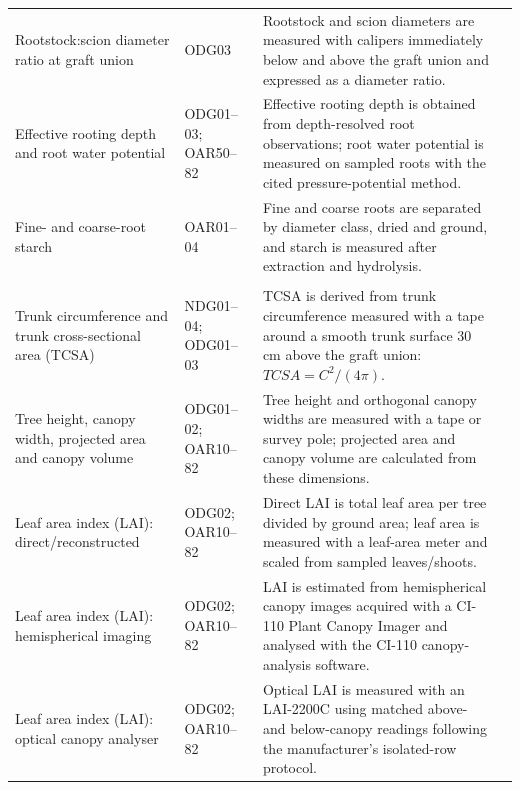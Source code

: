 \begin{landscape}
\begin{longtable}{>{\RaggedRight\arraybackslash}p{5.1cm} >{\RaggedRight\arraybackslash}p{2.3cm} >{\RaggedRight\arraybackslash}p{16.7cm} >{\RaggedRight\arraybackslash}p{2.4cm}}
Rootstock:scion diameter ratio at graft union &
ODG03 &
Rootstock and scion diameters are measured with calipers immediately below and above the graft union and expressed as a diameter ratio. &
\citep{serrano2023}\\

Effective rooting depth and root water potential &
ODG01--03; OAR50--82 &
Effective rooting depth is obtained from depth-resolved root observations; root water potential is measured on sampled roots with the cited pressure-potential method. &
\citep{tsoulias2020}\\

Fine- and coarse-root starch &
OAR01--04 &
Fine and coarse roots are separated by diameter class, dried and ground, and starch is measured after extraction and hydrolysis. &
\citep{mochizuki1956}\\

\multicolumn{4}{l}{\textbf{Tree size, canopy, crop load and productivity}}\\
Trunk circumference and trunk cross-sectional area (TCSA) &
NDG01--04; ODG01--03 &
TCSA is derived from trunk circumference measured with a tape around a smooth trunk surface 30 cm above the graft union: $TCSA=C^2/(4\pi)$. &
\citep{gonzalez2023}\\

Tree height, canopy width, projected area and canopy volume &
ODG01--02; OAR10--82 &
Tree height and orthogonal canopy widths are measured with a tape or survey pole; projected area and canopy volume are calculated from these dimensions. &
\citep{sun2020}\\

Leaf area index (LAI): direct/reconstructed &
ODG02; OAR10--82 &
Direct LAI is total leaf area per tree divided by ground area; leaf area is measured with a leaf-area meter and scaled from sampled leaves/shoots. &
\citep{wunsche1996,middleton2002}\\

Leaf area index (LAI): hemispherical imaging &
ODG02; OAR10--82 &
LAI is estimated from hemispherical canopy images acquired with a CI-110 Plant Canopy Imager and analysed with the CI-110 canopy-analysis software. &
\citep{knerl2018}\\

Leaf area index (LAI): optical canopy analyser &
ODG02; OAR10--82 &
Optical LAI is measured with an LAI-2200C using matched above- and below-canopy readings following the manufacturer's isolated-row protocol. &
\citep{licor_lai2200c}\\


\end{longtable}
\end{landscape}
